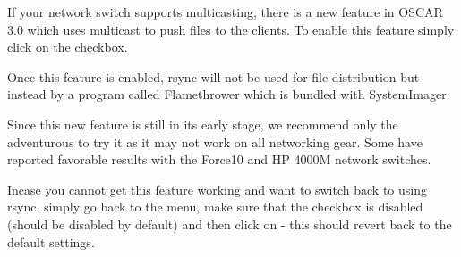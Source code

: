 \begchange
If your network switch supports multicasting, there is a new feature in
OSCAR 3.0 which uses multicast to push files to the clients.  To enable
this feature simply click on the  checkbox. 

Once this feature is enabled, rsync will not be used for file distribution
but instead by a program called Flamethrower which is bundled with
SystemImager.

Since this new feature is still in its early stage, we recommend only the
adventurous to try it as it may not work on all networking gear.  Some
have reported favorable results with the Force10 and HP 4000M network
switches.

Incase you cannot get this feature working and want to switch back to 
using rsync, simply go back to the  menu, make
sure that the  checkbox is disabled (should be
disabled by default) and then click on  -
this should revert back to the default settings.
\endchange


